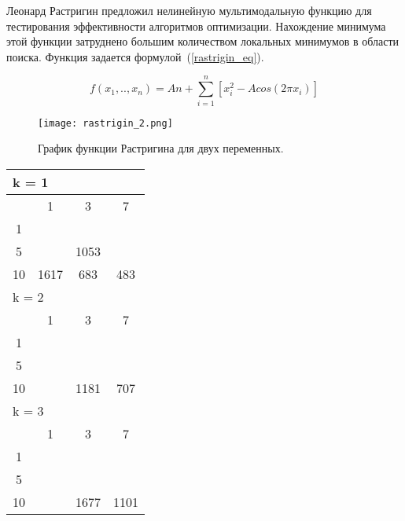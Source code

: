 Леонард Растригин предложил нелинейную мультимодальную функцию для тестирования эффективности алгоритмов оптимизации. Нахождение минимума этой функции затруднено большим количеством локальных минимумов в области поиска. Функция задается формулой~(\ref{rastrigin_eq}).

\begin{equation}
\label{rastrigin_eq}
f(x_1, .., x_n) = An + \sum\limits_{i = 1}^n\left[ x_i^2 - Acos\left(2 \pi x_i \right)\right]
\end{equation}

\begin{figure}
    \centering
    \texttt{[image: rastrigin\_2.png]}
    \caption{График функции Растригина для двух переменных.}
    \label{rastrigin_plot}
\end{figure}

\begin{table}
  \centering
  \begin{tabular}{|*4{c|}}
  \hline
  \multicolumn{4}{|l|}{k = 1} \\
  \hline
  \diagbox{$\mu$}{$\lambda$} & \multicolumn{1}{c|}{1} & \multicolumn{1}{c|}{3} & \multicolumn{1}{c|}{7} \\
  \hline
  1& \cellcolor{olive}{5124} & \cellcolor{olive}{2301} & \cellcolor{olive}{1411} \\
  \hline
  5& \cellcolor{olive}{1859} & 1053 & \cellcolor{olive}{401} \\
  \hline
  10 & 1617 & 683 & 483 \\
  \hline
  \multicolumn{4}{|l|}{k = 2} \\
  \hline
  \diagbox{$\mu$}{$\lambda$} & \multicolumn{1}{c|}{1} & \multicolumn{1}{c|}{3} & \multicolumn{1}{c|}{7} \\
  \hline
  1& \cellcolor{olive}{5165} & \cellcolor{olive}{3461} & \cellcolor{olive}{1753} \\
  \hline
  5& \cellcolor{olive}{1990} & \cellcolor{olive}{1396} & \cellcolor{olive}{934} \\
  \hline
  10& \cellcolor{olive}{2022} & 1181 & 707 \\
  \hline
  \multicolumn{4}{|l|}{k = 3} \\
  \hline
  \diagbox{$\mu$}{$\lambda$} & \multicolumn{1}{c|}{1} & \multicolumn{1}{c|}{3} & \multicolumn{1}{c|}{7} \\
  \hline
  1& \cellcolor{olive}{6535}& \cellcolor{olive}{3391}& \cellcolor{olive}{2573} \\
  \hline
  5& \cellcolor{olive}{3148}& \cellcolor{olive}{1721}& \cellcolor{olive}{1231} \\
  \hline
  10& \cellcolor{olive}{2352} & 1677 & 1101 \\
  \hline
  \end{tabular}
\end{table}


